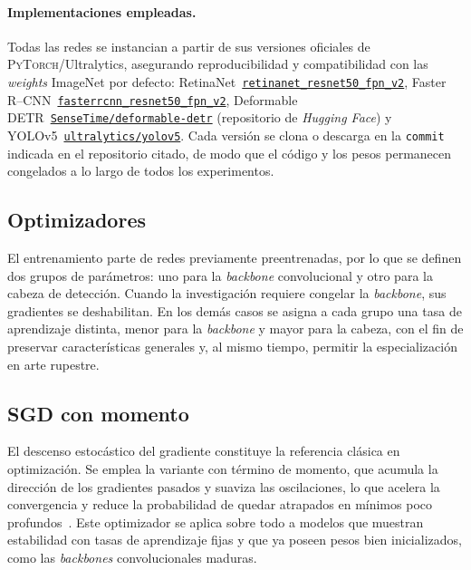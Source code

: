 \paragraph{Implementaciones empleadas.}
Todas las redes se instancian a partir de sus versiones oficiales de \textsc{PyTorch}/Ultralytics, asegurando reproducibilidad y compatibilidad con las \textit{weights} ImageNet por defecto:
RetinaNet~\href{https://pytorch.org/vision/main/models/generated/torchvision.models.detection.retinanet_resnet50_fpn_v2.html}{\texttt{retinanet\_resnet50\_fpn\_v2}},
Faster\,R--CNN~\href{https://pytorch.org/vision/main/models/generated/torchvision.models.detection.fasterrcnn_resnet50_fpn_v2.html}{\texttt{fasterrcnn\_resnet50\_fpn\_v2}},
Deformable\,DETR~\href{https://huggingface.co/SenseTime/deformable-detr}{\texttt{SenseTime/deformable-detr}} (repositorio de \textit{Hugging Face})
y YOLOv5~\href{https://github.com/ultralytics/yolov5}{\texttt{ultralytics/yolov5}}.
Cada versión se clona o descarga en la \texttt{commit} indicada en el repositorio citado, de modo que el código y los pesos permanecen congelados a lo largo de todos los experimentos.


\subsection{Optimizadores}

El entrenamiento parte de redes previamente preentrenadas, por lo que se definen dos grupos de parámetros: uno para la \emph{backbone} convolucional y otro para la cabeza de detección.
Cuando la investigación requiere congelar la \emph{backbone}, sus gradientes se deshabilitan.
En los demás casos se asigna a cada grupo una tasa de aprendizaje distinta, menor para la \emph{backbone} y mayor para la cabeza, con el fin de preservar características generales y, al mismo tiempo, permitir la especialización en arte rupestre.

\subsection*{SGD con momento}
El descenso estocástico del gradiente constituye la referencia clásica en optimización.
Se emplea la variante con término de momento, que acumula la dirección de los gradientes pasados y suaviza las oscilaciones, lo que acelera la convergencia y reduce la probabilidad de quedar atrapados en mínimos poco profundos~\cite{robbins1951stochastic,qian1999momentum}.
Este optimizador se aplica sobre todo a modelos que muestran estabilidad con tasas de aprendizaje fijas y que ya poseen pesos bien inicializados, como las \emph{backbones} convolucionales maduras.

